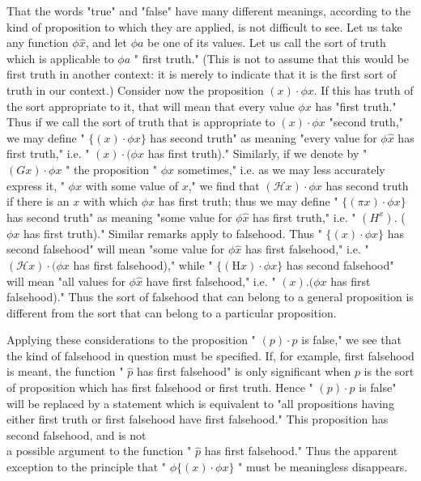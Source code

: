 \documentclass[10pt]{article}
\begin{document}
That the words "true" and "false" have many different meanings, according to the kind of proposition to which they are applied, is not difficult to see. Let us take any function $\phi \hat{x}$, and let $\phi a$ be one of its values. Let us call the sort of truth which is applicable to $\phi a$ " first truth." (This is not to assume that this would be first truth in another context: it is merely to indicate that it is the first sort of truth in our context.) Consider now the proposition $(x) \cdot \phi x$. If this has truth of the sort appropriate to it, that will mean that every value $\phi x$ has "first truth." Thus if we call the sort of truth that is appropriate to $(x) \cdot \phi x$ "second truth," we may define " $\{(x) \cdot \phi x\}$ has second truth" as meaning "every value for $\phi \hat{x}$ has first truth," i.e. " $(x) \cdot(\phi x$ has first truth)." Similarly, if we denote by " $(G x) \cdot \phi x$ " the proposition " $\phi x$ sometimes," i.e. as we may less accurately express it, " $\phi x$ with some value of $x$," we find that $(\mathcal{H} x) \cdot \phi x$ has second truth if there is an $x$ with which $\phi x$ has first truth; thus we may define " $\{(\pi x) \cdot \phi x\}$ has second truth" as meaning "some value for $\phi \hat{x}$ has first truth," i.e. " $\left(H^{x}\right)$. ( $\phi x$ has first truth)." Similar remarks apply to falsehood. Thus " $\{(x) \cdot \phi x\}$ has second falsehood" will mean "some value for $\phi \hat{x}$ has first falsehood," i.e. " $(\mathcal{H} x) \cdot(\phi x$ has first falsehood)," while " $\{(\mathrm{H} x) \cdot \phi x\}$ has second falsehood" will mean "all values for $\phi \hat{x}$ have first falsehood," i.e. " $(x) .(\phi x$ has first falsehood)." Thus the sort of falsehood that can belong to a general proposition is different from the sort that can belong to a particular proposition.

Applying these considerations to the proposition " $(p) \cdot p$ is false," we see that the kind of falsehood in question must be specified. If, for example, first falsehood is meant, the function " $\hat{p}$ has first falsehood" is only significant when $p$ is the sort of proposition which has first falsehood or first truth. Hence " $(p) \cdot p$ is false" will be replaced by a statement which is equivalent to "all propositions having either first truth or first falsehood have first falsehood." This proposition has second falsehood, and is not\\
a possible argument to the function " $\hat{p}$ has first falsehood." Thus the apparent exception to the principle that " $\phi\{(x) \cdot \phi x\}$ " must be meaningless disappears.
\end{document}
